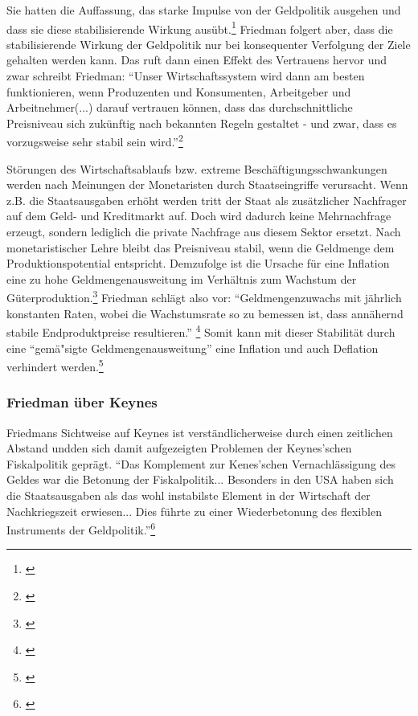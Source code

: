 \documentclass[
        onecolumn,
        a4paper,
        abstracton,
        parskip=half
        ,final
        ]{scrartcl}
\begin{document}
Sie hatten die Auffassung, das starke Impulse von der Geldpolitik ausgehen und
dass sie diese stabilisierende Wirkung aus{\"u}bt.\footnote[502]{\citep*[S.181]{bombach1981theorie}}
 Friedman folgert aber, dass die stabilisierende Wirkung der Geldpolitik nur bei konsequenter Verfolgung
der Ziele gehalten werden kann. Das ruft dann einen Effekt des Vertrauens
hervor und zwar schreibt Friedman: "`Unser Wirtschaftssystem wird dann am
besten funktionieren, wenn Produzenten und Konsumenten, Arbeitgeber und
Arbeitnehmer(...) darauf vertrauen k{\"o}nnen, dass das durchschnittliche
Preisniveau sich zuk{\"u}nftig nach bekannten Regeln gestaltet - und zwar, dass
es vorzugsweise sehr stabil sein wird."'\footnote[503]{\citep*[vgl.][S.150]{friedman1970die}}

St{\"o}rungen des Wirtschaftsablaufs bzw. extreme Besch{\"a}ftigungsschwankungen
werden nach Meinungen der Monetaristen durch Staatseingriffe verursacht. Wenn
z.B. die Staatsausgaben erh{\"o}ht werden tritt der Staat als zus{\"a}tzlicher
Nachfrager auf dem Geld- und Kreditmarkt auf. Doch wird dadurch keine
Mehrnachfrage erzeugt, sondern lediglich die private Nachfrage aus diesem
Sektor ersetzt. Nach monetaristischer Lehre bleibt das Preisniveau stabil,
wenn die Geldmenge dem Produktionspotential entspricht. Demzufolge ist die
Ursache f{\"u}r eine Inflation eine zu hohe Geldmengenausweitung im Verh{\"a}ltnis zum
Wachstum der G{\"u}terproduktion.\footnote[504]{\citep*[vgl.][S.213]{peters2000}}
Friedman schl{\"a}gt also vor: "`Geldmengenzuwachs mit j{\"a}hrlich konstanten Raten, wobei die Wachstumsrate so zu bemessen ist, dass ann{\"a}hernd stabile Endproduktpreise resultieren."' \footnote[505]{\citep*[vgl.][S.132]{friedman1970die}} Somit kann mit dieser
Stabilit{\"a}t durch eine "`gem{\"a}{"s}igte Geldmengenausweitung"' eine Inflation und auch
Deflation verhindert werden.\footnote[506]{\citep*[vgl.][S.155]{friedman1970die}}





\subsubsection{Friedman {\"u}ber Keynes} %
Friedmans Sichtweise auf Keynes ist verst{\"a}ndlicherweise durch einen zeitlichen Abstand undden sich damit aufgezeigten Problemen der Keynes'schen Fiskalpolitik gepr{\"a}gt.  "`Das Komplement zur Kenes'schen Vernachl{\"a}ssigung des Geldes war die Betonung der
Fiskalpolitik... Besonders in den USA haben sich die Staatsausgaben als das wohl instabilste Element in der Wirtschaft der Nachkriegszeit erwiesen... Dies f{\"u}hrte zu einer Wiederbetonung des flexiblen Instruments der Geldpolitik."'\footnote[801]{\citep*[S.105]{friedman1970die}}
\end{document}
